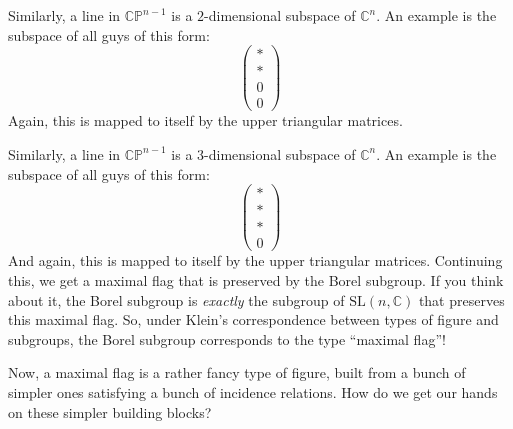 \documentclass{article}
\begin{document}
Similarly, a line in \(\mathbb{CP}^{n-1}\) is a \(2\)-dimensional
subspace of \(\mathbb{C}^n\). An example is the subspace of all guys of
this form: \[
  \left(
    \begin{array}{c}
      *\\*\\0\\0
    \end{array}
  \right)
\] Again, this is mapped to itself by the upper triangular matrices.

Similarly, a line in \(\mathbb{CP}^{n-1}\) is a \(3\)-dimensional
subspace of \(\mathbb{C}^n\). An example is the subspace of all guys of
this form: \[
  \left(
    \begin{array}{c}
      *\\*\\*\\0
    \end{array}
  \right)
\] And again, this is mapped to itself by the upper triangular matrices.
Continuing this, we get a maximal flag that is preserved by the Borel
subgroup. If you think about it, the Borel subgroup is \emph{exactly}
the subgroup of \(\mathrm{SL}(n,\mathbb{C})\) that preserves this
maximal flag. So, under Klein's correspondence between types of figure
and subgroups, the Borel subgroup corresponds to the type ``maximal
flag''!

Now, a maximal flag is a rather fancy type of figure, built from a bunch
of simpler ones satisfying a bunch of incidence relations. How do we get
our hands on these simpler building blocks?
\end{document}
